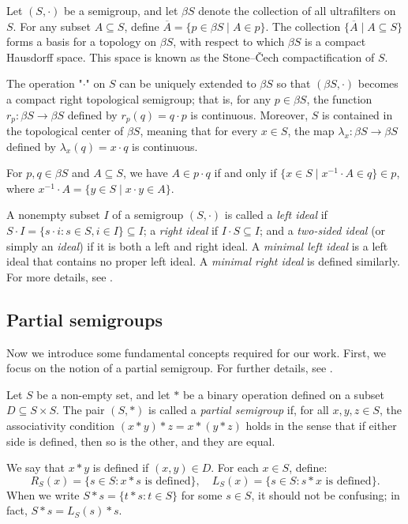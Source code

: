 \documentclass[twoside,11pt]{article}
\begin{document}
Let \( (S, \cdot) \) be a semigroup, and let $\beta S$ denote the collection of all ultrafilters on $S$. For any subset \( A \subseteq S \), define $\overline{A} = \{p \in \beta S \mid A \in p\}$. The collection \(\{\overline{A} \mid A \subseteq S\}\) forms a basis for a topology on \(\beta S\), with respect to which $\beta S$ is a compact Hausdorff space. This space is known as the Stone–Čech compactification of \(S\).

The operation "\(\cdot\)" on \(S\) can be uniquely extended to $\beta S$ so that \((\beta S, \cdot)\) becomes a compact right topological semigroup; that is, for any \(p \in \beta S\), the function \(r_p \colon \beta S \to \beta S\) defined by \(r_p(q) = q \cdot p\) is continuous. Moreover, \(S\) is contained in the topological center of \(\beta S\), meaning that for every \(x \in S\), the map \(\lambda_x \colon \beta S \to \beta S\) defined by \(\lambda_x(q) = x \cdot q\) is continuous.

For \(p, q \in \beta S\) and \(A \subseteq S\), we have \(A \in p \cdot q\) if and only if \(\{x \in S \mid x^{-1} \cdot A \in q\} \in p\), where \(x^{-1} \cdot A = \{y \in S \mid x \cdot y \in A\}\).

A nonempty subset \(I\) of a semigroup \((S, \cdot)\) is called a \textit{left ideal} if \(S \cdot I = \{s \cdot i : s \in S, i \in I\} \subseteq I\); a \textit{right ideal} if \(I \cdot S \subseteq I\); and a \textit{two-sided ideal} (or simply an \textit{ideal}) if it is both a left and right ideal. A \textit{minimal left ideal} is a left ideal that contains no proper left ideal. A \textit{minimal right ideal} is defined similarly. For more details, see \cite{Hindman}.

\subsection{Partial semigroups}
Now we introduce some fundamental concepts required for our work. First, we focus on the notion of a partial semigroup. For further details, see \cite{Hindman,McCutcheon}.

Let $S$ be a non-empty set, and let $*$ be a binary operation defined on a subset $D \subseteq S \times S$. The pair \((S, *)\) is called a \textit{partial semigroup} if, for all \(x, y, z \in S\), the associativity condition \((x * y) * z = x * (y * z)\) holds in the sense that if either side is defined, then so is the other, and they are equal.

We say that \(x * y\) is defined if \((x, y) \in D\). For each \(x \in S\), define:
\[
R_S(x) = \{s \in S : x * s \text{ is defined} \}, \quad L_S(x) = \{s \in S : s * x \text{ is defined} \}.
\]
When we write \(S * s = \{t * s : t \in S\}\) for some \(s \in S\), it should not be confusing; in fact, \(S * s = L_S(s) * s\).
\end{document}
